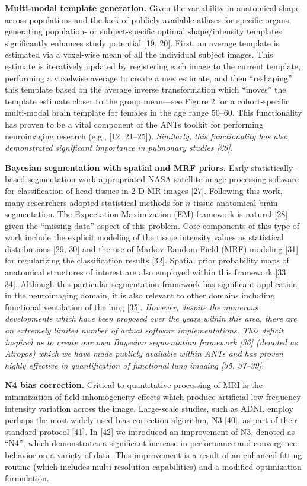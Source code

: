 \documentclass[11pt,]{article}
\begin{document}
\textbf{Multi-modal template generation.} Given the variability in
anatomical shape across populations and the lack of publicly available
atlases for specific organs, generating population- or subject-specific
optimal shape/intensity templates significantly enhances study potential
{[}19, 20{]}. First, an average template is estimated via a voxel-wise
mean of all the individual subject images. This estimate is iteratively
updated by registering each image to the current template, performing a
voxelwise average to create a new estimate, and then ``reshaping'' this
template based on the average inverse transformation which ``moves'' the
template estimate closer to the group mean---see Figure 2 for a
cohort-specific multi-modal brain template for females in the age range
50--60. This functionality has proven to be a vital component of the
ANTs toolkit for performing neuroimaging research (e.g., {[}12,
21--25{]}). \emph{Similarly, this functionality has also demonstrated
significant importance in pulmonary studies {[}26{]}.}

\textbf{Bayesian segmentation with spatial and MRF priors.} Early
statistically-based segmentation work appropriated NASA satellite image
processing software for classification of head tissues in 2-D MR images
{[}27{]}. Following this work, many researchers adopted statistical
methods for $n$-tissue anatomical brain segmentation. The
Expectation-Maximization (EM) framework is natural {[}28{]} given the
``missing data'' aspect of this problem. Core components of this type of
work include the explicit modeling of the tissue intensity values as
statistical distributions {[}29, 30{]} and the use of Markov Random
Field (MRF) modeling {[}31{]} for regularizing the classification
results {[}32{]}. Spatial prior probability maps of anatomical
structures of interest are also employed within this framework {[}33,
34{]}. Although this particular segmentation framework has significant
application in the neuroimaging domain, it is also relevant to other
domains including functional ventilation of the lung {[}35{]}.
\emph{However, despite the numerous developments which have been
proposed over the years within this area, there are an extremely limited
number of actual software implementations. This deficit inspired us to
create our own Bayesian segmentation framework {[}36{]} (denoted as
Atropos) which we have made publicly available within ANTs and has
proven highly effective in quantification of functional lung imaging
{[}35, 37--39{]}.}

\textbf{N4 bias correction.} Critical to quantitative processing of MRI
is the minimization of field inhomogeneity effects which produce
artificial low frequency intensity variation across the image.
Large-scale studies, such as ADNI, employ perhaps the most widely used
bias correction algorithm, N3 {[}40{]}, as part of their standard
protocol {[}41{]}. In {[}42{]} we introduced an improvement of N3,
denoted as ``N4'', which demonstrates a significant increase in
performance and convergence behavior on a variety of data. This
improvement is a result of an enhanced fitting routine (which includes
multi-resolution capabilities) and a modified optimization formulation.
\end{document}
